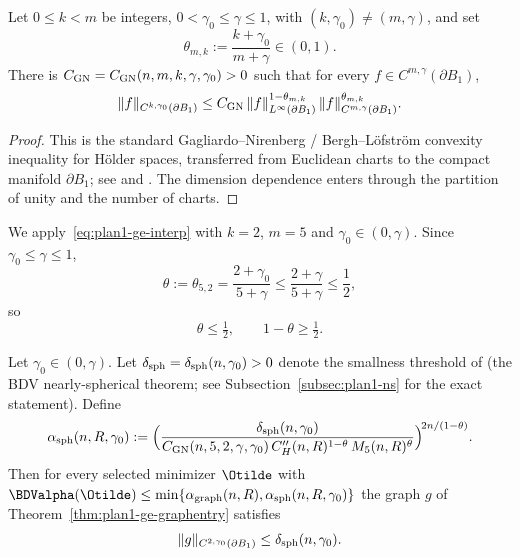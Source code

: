 \begin{lemma}
\label{lem:plan1-ge-interp}
Let \(0\le k<m\) be integers, \(0<\gamma_0\le\gamma\le 1\), with
\((k,\gamma_0)\neq(m,\gamma)\), and set
\begin{equation}\label{eq:plan1-ge-theta}
   \theta_{m,k}:=\frac{k+\gamma_0}{m+\gamma}\in(0,1).
\end{equation}
There is \(C_{\rm GN}=C_{\rm GN}(n,m,k,\gamma,\gamma_0)>0\) such that for
every \(f\in C^{m,\gamma}(\partial B_1)\),
\begin{equation}\label{eq:plan1-ge-interp}
   \|f\|_{C^{k,\gamma_0}(\partial B_1)}
   \le C_{\rm GN}\,
   \|f\|_{L^\infty(\partial B_1)}^{1-\theta_{m,k}}\,
   \|f\|_{C^{m,\gamma}(\partial B_1)}^{\theta_{m,k}}.
\end{equation}
\end{lemma}

\begin{proof}
This is the standard Gagliardo--Nirenberg / Bergh--L\"ofstr\"om convexity
inequality for H\"older spaces, transferred from Euclidean charts to the
compact manifold \(\partial B_1\); see
\cite[Lemma~6.32]{GT1983} and
\cite[Theorem~6.4.5]{BL1976}. The dimension dependence enters
through the partition of unity and the number of charts.
\end{proof}

We apply~\eqref{eq:plan1-ge-interp} with \(k=2\), \(m=5\) and
\(\gamma_0\in(0,\gamma)\). Since \(\gamma_0\le\gamma\le 1\),
\[
   \theta:=\theta_{5,2}=\frac{2+\gamma_0}{5+\gamma}
   \le\frac{2+\gamma}{5+\gamma}\le\frac12,
\]
so
\begin{equation}\label{eq:plan1-ge-theta-half}
   \theta\le\tfrac12,\qquad 1-\theta\ge\tfrac12.
\end{equation}

\begin{theorem}
\label{thm:plan1-ge-sph-entry}
Let \(\gamma_0\in(0,\gamma)\). Let \(\delta_{\rm sph}=\delta_{\rm sph}(n,\gamma_0)>0\)
denote the smallness threshold of \cite[Theorem~3.3]{BDV} (the BDV
nearly-spherical theorem; see Subsection~\ref{subsec:plan1-ns} for the
exact statement). Define
\begin{equation}\label{eq:plan1-ge-alpha-sph}
   \alpha_{\rm sph}(n,R,\gamma_0)
   :=\Bigl(
       \frac{\delta_{\rm sph}(n,\gamma_0)}
            {C_{\rm GN}(n,5,2,\gamma,\gamma_0)\,
             C_H''(n,R)^{1-\theta}\,
             M_5(n,R)^{\theta}}
     \Bigr)^{\!2n/(1-\theta)}.
\end{equation}
Then for every selected minimizer \(\Otilde\) with
\(\BDValpha(\Otilde)\le\min\{\alpha_{\rm graph}(n,R),\alpha_{\rm sph}(n,R,\gamma_0)\}\)
the graph \(g\) of Theorem~\ref{thm:plan1-ge-graphentry} satisfies
\begin{equation}\label{eq:plan1-ge-smallC2}
   \|g\|_{C^{2,\gamma_0}(\partial B_1)}\le\delta_{\rm sph}(n,\gamma_0).
\end{equation}
\end{theorem}


